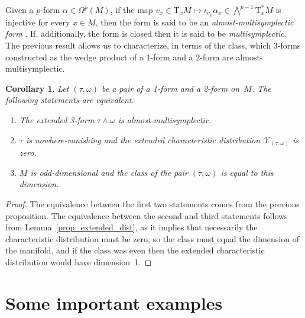 \documentclass[11pt,twoside]{article}
\theoremstyle{plain}
\newtheorem{corollary}[theorem]{Corollary}
\theoremstyle{definition}
\newcommand{\T}{{\mathrm T}}
\newcommand*{\inn}[1]{\iota_{#1}}
\begin{document}
Given a $p$-form $\alpha \in \Omega^p(M)$, if the map 
$v_x\in \T_x M\mapsto \inn{v_x} \alpha_x\in \bigwedge^{p-1} \T^*_x M$ 
is injective for every $x\in M$, 
then the form is said to be an \emph{almost-multisymplectic form} \cite{CIL_99}. 
If, additionally, the form is closed then it is said to be \emph{multisymplectic}.
The previous result allows us to characterize, in terms of the class, which 3-forms constructed as the wedge product of a 1-form and a 2-form are almost-multisymplectic.

\begin{corollary}
\label{3-form_injective}
Let $(\tau,\omega)$ be a pair of a 1-form and a 2-form on~$M$. 
The following statements are equivalent.
\begin{enumerate}[$(i)$]
\item 
The extended 3-form $\tau \wedge \omega$ is almost-multisymplectic.
\item 
$\tau$ is nowhere-vanishing and
the extended characteristic distribution $\mathcal{X}_{(\tau,\omega)}$ is zero.
\item 
$M$ is odd-dimensional and 
the class of the pair $(\tau,\omega)$ is equal to this dimension.
\end{enumerate}
\end{corollary}
\begin{proof}
    The equivalence between the first two statements comes from the previous proposition.
    The equivalence between the second and third statements follows from Lemma~\ref{prop_extended_dist}, as it implies that necessarily the characteristic distribution must be zero, so the class must equal the dimension of the manifold, and if the class was even then the extended characteristic distribution would have dimension~1.
\end{proof}






\section{Some important examples}
\label{sec_examples}
\end{document}
